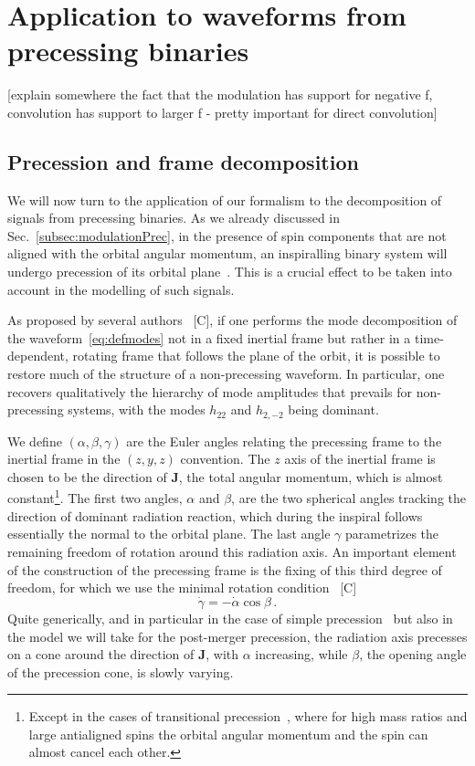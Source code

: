 \documentclass[aps,showpacs,twocolumn,
prd,superscriptaddress,nofootinbib]{revtex4-1}
\newcommand{\be}{\begin{equation}}
\newcommand{\ee}{\end{equation}}
\newcommand{\SM}[1]{{\color{Red} #1}}
\begin{document}

\section{Application to waveforms from precessing binaries}
\label{sec:precession}

\SM{[explain somewhere the fact that the modulation has support for negative f, convolution has support to larger f - pretty important for direct convolution]}


\subsection{Precession and frame decomposition}
\label{subsec:precdef}

We will now turn to the application of our formalism to the decomposition of signals from precessing binaries. As we already discussed in Sec.~\ref{subsec:modulationPrec}, in the presence of spin components that are not aligned with the orbital angular momentum, an inspiralling binary system will undergo precession of its orbital plane~\cite{Apostolatos+94, Kidder95}. This is a crucial effect to be taken into account in the modelling of such signals.

As proposed by several authors~\cite{} \SM{[C]}, if one performs the mode decomposition of the waveform~\eqref{eq:defmodes} not in a fixed inertial frame but rather in a time-dependent, rotating frame that follows the plane of the orbit, it is possible to restore much of the structure of a non-precessing waveform. In particular, one recovers qualitatively the hierarchy of mode amplitudes that prevails for non-precessing systems, with the modes $h_{22}$ and $h_{2,-2}$ being dominant.

We define $(\alpha, \beta, \gamma)$ are the Euler angles relating the precessing frame to the inertial frame in the $(z,y,z)$ convention. The $z$ axis of the inertial frame is chosen to be the direction of $\bm{J}$, the total angular momentum, which is almost constant\footnote{Except in the cases of transitional precession~\cite{Apostolatos+94}, where for high mass ratios and large antialigned spins the orbital angular momentum and the spin can almost cancel each other.}. The first two angles, $\alpha$ and $\beta$, are the two spherical angles tracking the direction of dominant radiation reaction, which during the inspiral follows essentially the normal to the orbital plane. The last angle $\gamma$ parametrizes the remaining freedom of rotation around this radiation axis. An important element of the construction of the precessing frame is the fixing of this third degree of freedom, for which we use the minimal rotation condition~\cite{} \SM{[C]}
\be\label{eq:gammadot}
	\dot{\gamma} = -\dot{\alpha}\cos \beta \,.
\ee
Quite generically, and in particular in the case of simple precession~\cite{Apostolatos+94, Kidder95} but also in the model we will take for the post-merger precession, the radiation axis precesses on a cone around the direction of $\bm{J}$, with $\alpha$ increasing, while $\beta$, the opening angle of the precession cone, is slowly varying.
\end{document}
